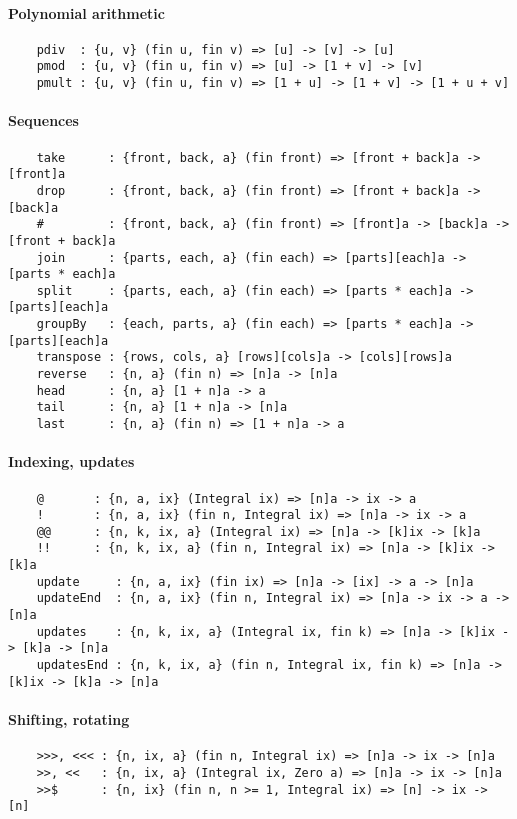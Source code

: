 \paragraph*{Polynomial arithmetic}
\begin{Verbatim}
    pdiv  : {u, v} (fin u, fin v) => [u] -> [v] -> [u]
    pmod  : {u, v} (fin u, fin v) => [u] -> [1 + v] -> [v]
    pmult : {u, v} (fin u, fin v) => [1 + u] -> [1 + v] -> [1 + u + v]
\end{Verbatim}
\paragraph*{Sequences}
\begin{Verbatim}
    take      : {front, back, a} (fin front) => [front + back]a -> [front]a
    drop      : {front, back, a} (fin front) => [front + back]a -> [back]a
    #         : {front, back, a} (fin front) => [front]a -> [back]a -> [front + back]a
    join      : {parts, each, a} (fin each) => [parts][each]a -> [parts * each]a
    split     : {parts, each, a} (fin each) => [parts * each]a -> [parts][each]a
    groupBy   : {each, parts, a} (fin each) => [parts * each]a -> [parts][each]a
    transpose : {rows, cols, a} [rows][cols]a -> [cols][rows]a
    reverse   : {n, a} (fin n) => [n]a -> [n]a
    head      : {n, a} [1 + n]a -> a
    tail      : {n, a} [1 + n]a -> [n]a
    last      : {n, a} (fin n) => [1 + n]a -> a
\end{Verbatim}
\paragraph*{Indexing, updates}
\begin{Verbatim}
    @       : {n, a, ix} (Integral ix) => [n]a -> ix -> a
    !       : {n, a, ix} (fin n, Integral ix) => [n]a -> ix -> a
    @@      : {n, k, ix, a} (Integral ix) => [n]a -> [k]ix -> [k]a
    !!      : {n, k, ix, a} (fin n, Integral ix) => [n]a -> [k]ix -> [k]a
    update     : {n, a, ix} (fin ix) => [n]a -> [ix] -> a -> [n]a
    updateEnd  : {n, a, ix} (fin n, Integral ix) => [n]a -> ix -> a -> [n]a
    updates    : {n, k, ix, a} (Integral ix, fin k) => [n]a -> [k]ix -> [k]a -> [n]a
    updatesEnd : {n, k, ix, a} (fin n, Integral ix, fin k) => [n]a -> [k]ix -> [k]a -> [n]a
\end{Verbatim}
\paragraph*{Shifting, rotating}
\begin{Verbatim}
    >>>, <<< : {n, ix, a} (fin n, Integral ix) => [n]a -> ix -> [n]a
    >>, <<   : {n, ix, a} (Integral ix, Zero a) => [n]a -> ix -> [n]a
    >>$      : {n, ix} (fin n, n >= 1, Integral ix) => [n] -> ix -> [n]
\end{Verbatim}
